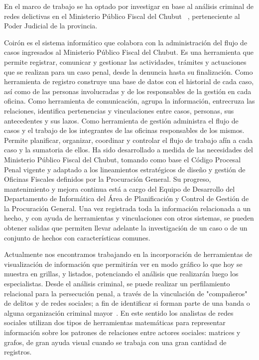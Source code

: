 En el marco de trabajo se ha optado por investigar en base al análisis criminal de redes delictivas en el Ministerio Público Fiscal del Chubut ~\cite{MPFChubutPaginaWeb}, perteneciente al Poder Judicial de la provincia.

Coirón es el sistema informático que colabora con la administración del flujo de casos ingresados al Ministerio Público Fiscal del Chubut. Es una herramienta que permite registrar, comunicar y gestionar las actividades, trámites y actuaciones que se realizan para un caso penal, desde la denuncia hasta su finalización. 
Como herramienta de registro construye una base de datos con el historial de cada caso, así como de las personas involucradas y de los responsables de la gestión en cada oficina. Como herramienta de comunicación, agrupa la información, entrecruza las relaciones, identifica pertenencias y vinculaciones entre casos, personas, sus antecedentes y sus lazos. Como herramienta de gestión administra el flujo de casos y el trabajo de los integrantes de las oficinas responsables de los mismos. Permite planificar, organizar, coordinar y controlar el flujo de trabajo afín a cada caso y la sumatoria de ellos.
Ha sido desarrollado a medida de las necesidades del Ministerio Público Fiscal del Chubut, tomando como base el Código Procesal Penal vigente y adaptado a los lineamientos estratégicos de diseño y gestión de Oficinas Fiscales definidos por la Procuración General. Su progreso, mantenimiento y mejora continua está a cargo del Equipo de Desarrollo del Departamento de Informática del Área de Planificación y Control de Gestión de la Procuración General. Una vez registrada toda la información relacionada a un hecho, y con ayuda de herramientas y vinculaciones con otros sistemas, se pueden obtener salidas que permiten llevar adelante la investigación de un caso o de un conjunto de hechos con características comunes.

Actualmente nos encontramos trabajando en la incorporación de herramientas de visualización de información que permitirán ver en modo gráfico lo que hoy se muestra en grillas, y listados, potenciando el análisis que realizarán luego los especialistas. Desde el análisis criminal, se puede realizar un perfilamiento relacional para la persecución penal, a través de la vinculación de "compañeros" de delitos y de redes sociales; a fin de identificar si forman parte de una banda o alguna organización criminal mayor~\cite{rua2020perspectiva}. En este sentido los analistas de redes sociales utilizan dos tipos de herramientas matemáticas para representar información sobre los patrones de relaciones entre actores sociales: matrices y grafos, de gran ayuda visual cuando se trabaja con una gran cantidad de registros.

